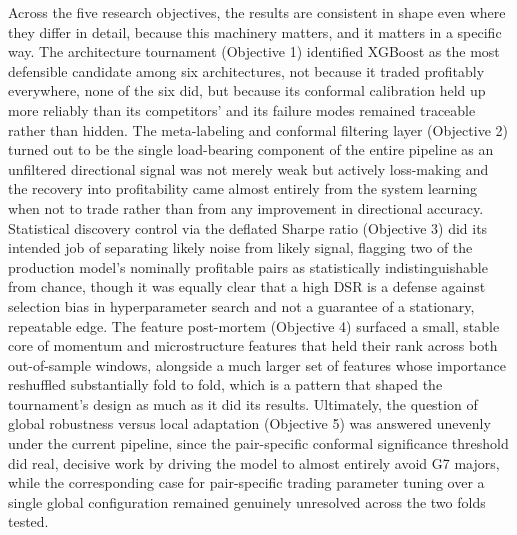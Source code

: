 \documentclass[12pt, a4paper]{article}
\begin{document}
\medskip

Across the five research objectives, the results are consistent in shape even where they differ in detail, because this machinery matters, and it matters in a specific way. The 
architecture tournament (Objective 1) identified XGBoost as the most defensible candidate among six architectures, not because it traded profitably everywhere, none of the six 
did, but because its conformal calibration held up more reliably than its competitors' and its failure modes remained traceable rather than hidden. The meta-labeling and conformal 
filtering layer (Objective 2) turned out to be the single load-bearing component of the entire pipeline as an unfiltered directional signal was not merely weak but actively 
loss-making and the recovery into profitability came almost entirely from the system learning when not to trade rather than from any improvement in directional accuracy. Statistical 
discovery control via the deflated Sharpe ratio (Objective 3) did its intended job of separating likely noise from likely signal, flagging two of the production model's nominally 
profitable pairs as statistically indistinguishable from chance, though it was equally clear that a high DSR is a defense against selection bias in hyperparameter search and not a 
guarantee of a stationary, repeatable edge. The feature post-mortem (Objective 4) surfaced a small, stable core of momentum and microstructure features that held their rank across 
both out-of-sample windows, alongside a much larger set of features whose importance reshuffled substantially fold to fold, which is a pattern that shaped the tournament's design as 
much as it did its results. Ultimately, the question of global robustness versus local adaptation (Objective 5) was answered unevenly under the current pipeline, since the 
pair-specific conformal significance threshold did real, decisive work by driving the model to almost entirely avoid G7 majors, while the corresponding case for pair-specific 
trading parameter tuning over a single global configuration remained genuinely unresolved across the two folds tested.

\medskip
\end{document}
